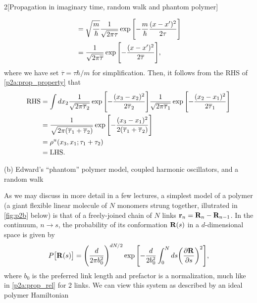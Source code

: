 \documentclass[12pt]{article}
\begin{document}
\begin{problem}{2}[Propagation in imaginary time, random walk and phantom
    polymer]
\begin{solution}
\begin{align}
    &=\sqrt{\frac{m}{\hbar}}\frac1{\sqrt{2\pi\tau}}
        \exp\qty[-\frac{m}{\hbar}\frac{(x-x')^2}{2\tau}]\notag\\
    &=\frac{1}{\sqrt{2\pi\overline{\tau}}}
        \exp\qty[-\frac{(x-x')^2}{2\overline\tau}],
\end{align}
where we have set $\overline\tau=\tau\hbar/m$ for simplification. Then, it
follows from the RHS of \eqref{p2a:prop_property} that
\begin{align}
    \text{RHS}
    &=\int dx_2\frac1{\sqrt{2\pi\overline\tau_2}}
        \exp\qty[-\frac{(x_3-x_2)^2}{2\overline\tau_2}]
        \frac1{\sqrt{2\pi\overline\tau_1}}
        \exp\qty[-\frac{(x_2-x_1)^2}{2\overline\tau_1}]\notag\\
    &=\frac1{\sqrt{2\pi(\overline\tau_1+\overline\tau_2)}}
    \exp\qty[-\frac{(x_3-x_1)^2}{2(\overline\tau_1+\overline\tau_2)}]\notag\\
    &=\rho^u(x_3,x_1;\tau_1+\tau_2)\notag\\
    &=\text{LHS}.
\end{align}
\end{solution}

(b) Edward's ``phantom'' polymer model, coupled harmonic oscillators, and a
random walk

As we may discuss in more detail in a few lectures, a simplest model of a
polymer (a giant flexible linear molecule of $N$ monomers strung together,
illutrated in \cref{fig:p2b} below) is that of a freely-joined chain of $N$
links $\vb{r}_n=\vb{R}_n-\vb{R}_{n-1}$. In the continuum, $n\to s$, the
probability of its conformation $\vb{R}(s)$ in a $d$-dimensional space is given
by
\begin{equation}\label{p2b:P}
    P\qty[\vb{R}(s)]=\qty(\frac{d}{2\pi b_0^2})^{dN/2}
    \exp\qty[-\frac{d}{2b_0^2}\int_0^N ds\qty(\frac{\partial\vb{R}}{\partial
        s})^2],
\end{equation}
where $b_0$ is the preferred link length and prefactor is a normalization, much
like in \cref{p2a:prop_rel} for 2 links. We can view this system as described by
an ideal polymer Hamiltonian


\end{problem}
\end{document}
